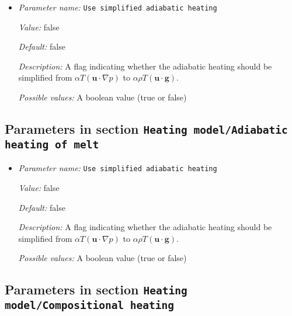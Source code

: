 \begin{itemize}
\item {\it Parameter name:} {\tt Use simplified adiabatic heating}
\label{parameters:Heating model/Adiabatic heating/Use simplified adiabatic heating}
\label{parameters:Heating_20model/Adiabatic_20heating/Use_20simplified_20adiabatic_20heating}


{\it Value:} false


{\it Default:} false


{\it Description:} A flag indicating whether the adiabatic heating should be simplified from $\alpha T (\mathbf u \cdot \nabla p)$ to $ \alpha \rho T (\mathbf u \cdot \mathbf g) $.


{\it Possible values:} A boolean value (true or false)
\end{itemize}

\subsection{Parameters in section \tt Heating model/Adiabatic heating of melt}
\label{parameters:Heating_20model/Adiabatic_20heating_20of_20melt}

\begin{itemize}
\item {\it Parameter name:} {\tt Use simplified adiabatic heating}
\label{parameters:Heating model/Adiabatic heating of melt/Use simplified adiabatic heating}
\label{parameters:Heating_20model/Adiabatic_20heating_20of_20melt/Use_20simplified_20adiabatic_20heating}


{\it Value:} false


{\it Default:} false


{\it Description:} A flag indicating whether the adiabatic heating should be simplified from $\alpha T (\mathbf u \cdot \nabla p)$ to $ \alpha \rho T (\mathbf u \cdot \mathbf g) $.


{\it Possible values:} A boolean value (true or false)
\end{itemize}

\subsection{Parameters in section \tt Heating model/Compositional heating}
\label{parameters:Heating_20model/Compositional_20heating}

